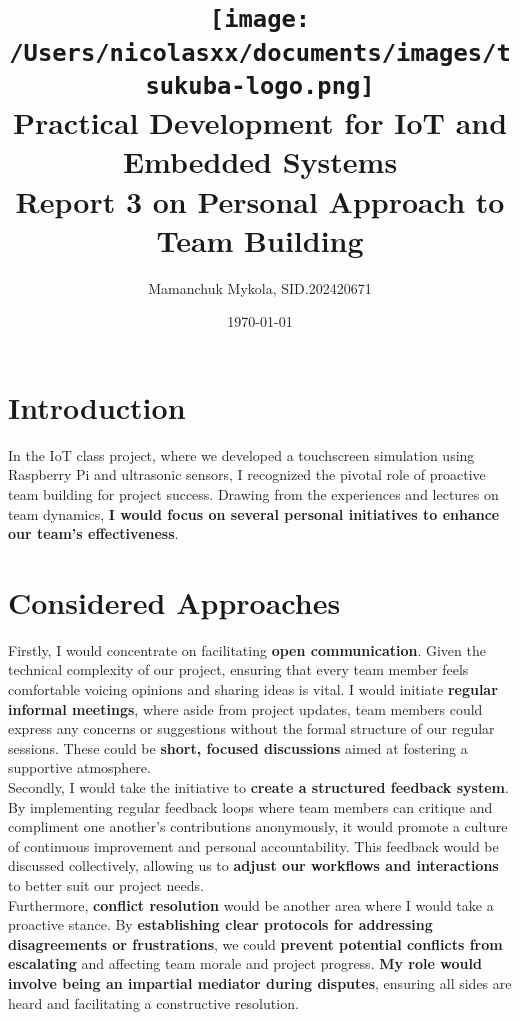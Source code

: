 \documentclass[12pt,a4paper]{article}
\title{
    \texttt{[image: /Users/nicolasxx/documents/images/tsukuba-logo.png]} \\
    \textbf{Practical Development for IoT and Embedded Systems} \\
    \vspace{3mm}    
    Report 3 on Personal Approach to Team Building
}
\author{Mamanchuk Mykola, SID.202420671}
\date{\today}
\begin{document}
\maketitle

\section{Introduction}
In the IoT class project, where we developed a touchscreen simulation using Raspberry Pi and ultrasonic sensors, I recognized the pivotal role of proactive team building for project success. Drawing from the experiences and lectures on team dynamics, \textbf{I would focus on several personal initiatives to enhance our team's effectiveness}.

\section{Considered Approaches}

Firstly, I would concentrate on facilitating \textbf{open communication}. Given the technical complexity of our project, ensuring that every team member feels comfortable voicing opinions and sharing ideas is vital. I would initiate \textbf{regular informal meetings}, where aside from project updates, team members could express any concerns or suggestions without the formal structure of our regular sessions. These could be \textbf{short, focused discussions} aimed at fostering a supportive atmosphere. \\

Secondly, I would take the initiative to \textbf{create a structured feedback system}. By implementing regular feedback loops where team members can critique and compliment one another's contributions anonymously, it would promote a culture of continuous improvement and personal accountability. This feedback would be discussed collectively, allowing us to \textbf{adjust our workflows and interactions} to better suit our project needs. \\

Furthermore, \textbf{conflict resolution} would be another area where I would take a proactive stance. By \textbf{establishing clear protocols for addressing disagreements or frustrations}, we could \textbf{prevent potential conflicts from escalating} and affecting team morale and project progress. \textbf{My role would involve being an impartial mediator during disputes}, ensuring all sides are heard and facilitating a constructive resolution. \\
\end{document}
